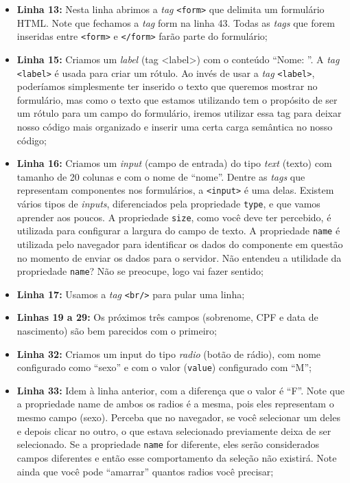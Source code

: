 \begin{itemize}
    \item \textbf{Linha 13:} Nesta linha abrimos a \textit{tag} \texttt{<form>} que delimita um formulário HTML. Note que fechamos a \textit{tag} form na linha 43. Todas as \textit{tags} que forem inseridas entre \texttt{<form>} e \texttt{</form>} farão parte do formulário;
    
    \item \textbf{Linha 15:} Criamos um \textit{label} (tag <label>) com o conteúdo ``Nome: ''. A \textit{tag} \texttt{<label>} é usada para criar um rótulo. Ao invés de usar a \textit{tag} \texttt{<label>}, poderíamos simplesmente ter inserido o texto que queremos mostrar no formulário, mas como o texto que estamos utilizando tem o propósito de ser um rótulo para um campo do formulário, iremos utilizar essa tag para deixar nosso código mais organizado e inserir uma certa carga semântica no nosso código;
    
    \item \textbf{Linha 16:} Criamos um \textit{input} (campo de entrada) do tipo \textit{text} (texto) com tamanho de 20 colunas e com o nome de ``nome''. Dentre as \textit{tags} que representam componentes nos formulários, a \texttt{<input>} é uma delas. Existem vários tipos de \textit{inputs}, diferenciados pela propriedade \texttt{type}, e que vamos aprender aos poucos. A propriedade \texttt{size}, como você deve ter percebido, é utilizada para configurar a largura do campo de texto. A propriedade \texttt{name} é utilizada pelo navegador para identificar os dados do componente em questão no momento de enviar os dados para o servidor. Não entendeu a utilidade da propriedade \texttt{name}? Não se preocupe, logo vai fazer sentido;
    
    \item \textbf{Linha 17:} Usamos a \textit{tag} \texttt{<br/>} para pular uma linha;
    
    \item \textbf{Linhas 19 a 29:} Os próximos três campos (sobrenome, CPF e data de nascimento) são bem parecidos com o primeiro;
    
    \item \textbf{Linha 32:} Criamos um input do tipo \textit{radio} (botão de rádio), com nome configurado como ``sexo'' e com o valor (\texttt{value}) configurado com ``M'';
    
    \item \textbf{Linha 33:} Idem à linha anterior, com a diferença que o valor é ``F''. Note que a propriedade name de ambos os radios é a mesma, pois eles representam o mesmo campo (sexo). Perceba que no navegador, se você selecionar um deles e depois clicar no outro, o que estava selecionado previamente deixa de ser selecionado. Se a propriedade \texttt{name} for diferente, eles serão considerados campos diferentes e então esse comportamento da seleção não existirá. Note ainda que você pode ``amarrar'' quantos radios você precisar;
    

\end{itemize}
